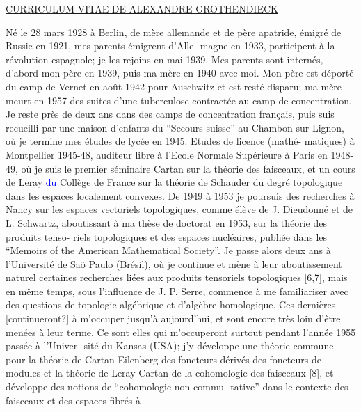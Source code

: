 \documentclass[11pt]{article}
\newcommand{\scanpage}[1]{\par\bigskip\noindent{\small\sffamily[scan #1]}\par}
\newcommand{\mspage}[1]{{\small\sffamily[p.\,#1]}}
\newcommand{\hand}[1]{\textcolor{blue}{#1}}
\newcommand{\uline}[1]{\underline{#1}}
\newcommand{\unsure}[1]{[#1?]}
\begin{document}
\uline{CURRICULUM VITAE DE ALEXANDRE GROTHENDIECK}

Né le 28 mars 1928 à Berlin, de mère allemande et de père
apatride, émigré de Russie en 1921, mes parents émigrent d'Alle-%
magne en 1933, participent à la révolution espagnole; je les
rejoins en mai 1939. Mes parents sont internés, d'abord mon père
en 1939, puis ma mère en 1940 avec moi. Mon père est déporté du
camp de Vernet en août 1942 pour Auschwitz et est resté disparu;
ma mère meurt en 1957 des suites d'une tuberculose contractée au
camp de concentration. Je reste près de deux ans dans des camps
de concentration français, puis suis recueilli par une maison
d'enfants du ``Secours suisse'' au Chambon-sur-Lignon, où je
termine mes études de lycée en 1945. Etudes de licence (mathé-%
matiques) à Montpellier 1945-48, auditeur libre à l'Ecole Normale
Supérieure à Paris en 1948-49, où je suis le premier séminaire
Cartan sur la théorie des faisceaux, et un cours de Leray \hand{du}
Collège de France sur la théorie de Schauder du degré topologique
dans les espaces localement convexes. De 1949 à 1953 je poursuis
des recherches à Nancy sur les espaces vectoriels topologiques,
comme élève de J. Dieudonné et de L. Schwartz, aboutissant à ma
thèse de doctorat en 1953, sur la théorie des produits tenso-%
riels topologiques et des espaces nucléaires, publiée dans les
``Memoirs of the American Mathematical Society''. Je passe alors
deux ans à l'Université de Saõ Paulo (Brésil), où je continue
et mène à leur aboutissement naturel certaines recherches liées
aux produits tensoriels topologiques [6,7], mais en même temps,
sous l'influence de J. P. Serre, commence à me familiariser avec
des questions de topologie algébrique et d'algèbre homologique.
Ces dernières \unsure{continueront} à m'occuper jusqu'à aujourd'hui, et
sont encore très loin d'être menées à leur terme. Ce sont elles
qui m'occuperont surtout pendant l'année 1955 passée à l'Univer-%
sité du Kansas (USA); j'y développe une théorie commune pour la
théorie de Cartan-Eilenberg des foncteurs dérivés des foncteurs
de modules et la théorie de Leray-Cartan de la cohomologie des
faisceaux [8], et développe des notions de ``cohomologie non commu-%
tative'' dans le contexte des faisceaux et des espaces fibrés à

\mspage{303}

\clearpage
\scanpage{119/304}
\mspage{-2-}
\end{document}
